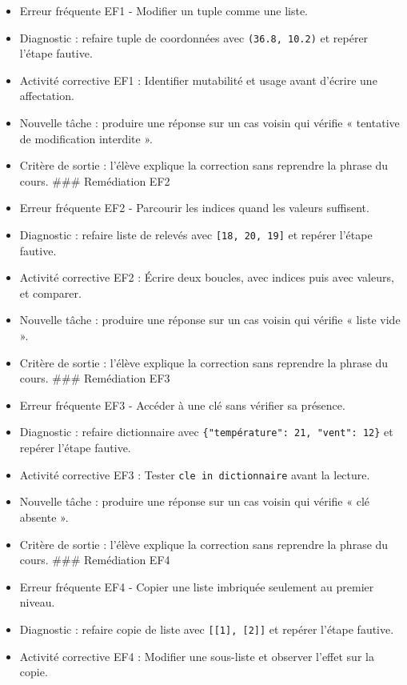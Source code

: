 \begin{itemize}
\tightlist
\item
  Erreur fréquente EF1 - Modifier un tuple comme une liste.
\item
  Diagnostic : refaire tuple de coordonnées avec \texttt{(36.8,\ 10.2)}
  et repérer l'étape fautive.
\item
  Activité corrective EF1 : Identifier mutabilité et usage avant
  d'écrire une affectation.
\item
  Nouvelle tâche : produire une réponse sur un cas voisin qui vérifie «
  tentative de modification interdite ».
\item
  Critère de sortie : l'élève explique la correction sans reprendre la
  phrase du cours. \#\#\# Remédiation EF2
\item
  Erreur fréquente EF2 - Parcourir les indices quand les valeurs
  suffisent.
\item
  Diagnostic : refaire liste de relevés avec \texttt{{[}18,\ 20,\ 19{]}}
  et repérer l'étape fautive.
\item
  Activité corrective EF2 : Écrire deux boucles, avec indices puis avec
  valeurs, et comparer.
\item
  Nouvelle tâche : produire une réponse sur un cas voisin qui vérifie «
  liste vide ».
\item
  Critère de sortie : l'élève explique la correction sans reprendre la
  phrase du cours. \#\#\# Remédiation EF3
\item
  Erreur fréquente EF3 - Accéder à une clé sans vérifier sa présence.
\item
  Diagnostic : refaire dictionnaire avec
  \texttt{\{"température":\ 21,\ "vent":\ 12\}} et repérer l'étape
  fautive.
\item
  Activité corrective EF3 : Tester \texttt{cle\ in\ dictionnaire} avant
  la lecture.
\item
  Nouvelle tâche : produire une réponse sur un cas voisin qui vérifie «
  clé absente ».
\item
  Critère de sortie : l'élève explique la correction sans reprendre la
  phrase du cours. \#\#\# Remédiation EF4
\item
  Erreur fréquente EF4 - Copier une liste imbriquée seulement au premier
  niveau.
\item
  Diagnostic : refaire copie de liste avec
  \texttt{{[}{[}1{]},\ {[}2{]}{]}} et repérer l'étape fautive.
\item
  Activité corrective EF4 : Modifier une sous-liste et observer l'effet
  sur la copie.

\end{itemize}

